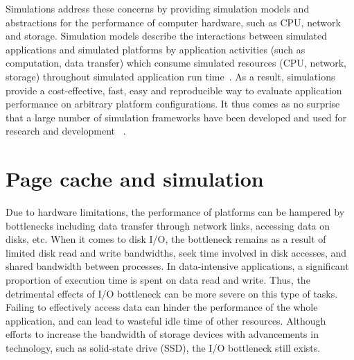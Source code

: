 Simulations address these concerns by providing simulation models and 
abstractions for the performance of computer hardware, such as CPU, 
network and storage. 
Simulation models describe the interactions between simulated applications 
and simulated platforms by  application activities (such as computation, 
data transfer) which consume simulated resources (CPU, network, storage) 
throughout simulated application run time~\cite{casanova2014simgrid}. 
As a result, simulations provide a cost-effective, fast, easy and reproducible 
way to evaluate application performance on arbitrary platform configurations. 
It thus comes as no surprise that a large number of simulation frameworks 
have been developed and used for research and development
~\cite{ optorsim, gridsim, groudsim, cloudsim, nunez2012simcan,
nunez2012icancloud, mdcsim, dissect_cf, cloudnetsimplusplus, 
fognetsimplusplus, casanova2014simgrid, ROSS, casanova2020fgcs}. 

\section{Page cache and simulation}

Due to hardware limitations, the performance of platforms can be hampered 
by bottlenecks including data transfer through network links, accessing data 
on disks, etc. 
When it comes to disk I/O, the bottleneck remains as a result of limited 
disk read and write bandwidths, seek time involved in disk accesses, 
and shared bandwidth between processes. 
In data-intensive applications, a significant proportion of execution time 
is spent on data read and write.
Thus, the detrimental effects of I/O bottleneck can be more severe on 
this type of tasks. 
Failing to effectively access data can hinder the performance of the 
whole application, and can lead to wasteful idle time of other resources. 
Although efforts to increase the bandwidth of storage devices with 
advancements in technology, such as solid-state drive (SSD), 
the I/O bottleneck still exists.

